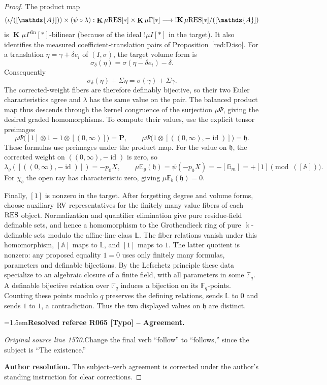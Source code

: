 \documentclass[12pt]{amsart}
\newcommand{\ResolvedRefereeRemark}[5]{%
  \par\medskip\begingroup\normalfont\small\color{gray}%
  \emergencystretch=1.5em\noindent\textbf{Resolved referee R#1 [#2] -- #3.}\par\nobreak\noindent #4\par
  \medskip\color{ResolutionGreen}\noindent\textbf{Author resolution.} #5\par
  \endgroup\medskip
}
\theoremstyle{plain}
\theoremstyle{definition}
\theoremstyle{remark}
\numberwithin{equation}{section}
\theoremstyle{plain}
\newcommand{\RV}{\textup{RV}}
\DeclareMathOperator{\id}{id}
\DeclareMathOperator{\K}{\mathds{k}}
\newcommand{\A}{\mathds{A}}
\newcommand{\G}{\mathds{G}}
\newcommand{\gh}{\mathfrak{h}}
\newcommand{\0}{\emptyset}
\newcommand{\bb}[1]{\mathbb{#1}}
\newcommand{\fun}{\longrightarrow}
\newcommand{\mG}{{\mu}{\Gamma}}
\newcommand{\RES}{\textup{RES}}
\newcommand{\mgRES}{{\mu}{\RES}}
\newcommand{\mgE}{{\mu}{\bb E}}
\DeclareMathOperator{\ggk}{\mathbf{K}}
\DeclareMathOperator{\sggk}{!\mathbf{K}}
\DeclareMathOperator{\fin}{fin}
\begin{document}
\begin{proof}
The product map
\[
(\iota /([\A])) \times (\psi \circ \lambda) : \ggk \mgRES[*] \times  \ggk \mG[*] \fun    \sggk \mgRES[*] /([\A])
\]
is $\ggk \mG^{\fin}[*]$-bilinear (because of the ideal $!\mu I[*]$ in the target).
It also identifies the measured coefficient-translation pairs of Proposition~\ref{red:D:iso}. For a translation $\eta=\gamma+\delta e_i$ of $(I,\sigma)$, the target volume form is
\[
\sigma_\delta(\eta)=\sigma(\eta-\delta e_i)-\delta.
\]
Consequently
\[
\sigma_\delta(\eta)+\Sigma\eta=\sigma(\gamma)+\Sigma\gamma.
\]
The corrected-weight fibers are therefore definably bijective, so their two Euler characteristics agree and $\lambda$ has the same value on the pair. The balanced product map thus descends through the kernel congruence of the surjection ${\mu}\Psi$, giving the desired graded homomorphisms. To compute their values, use the explicit tensor preimages
\[
{\mu}\Psi\bigl([1]\otimes1-1\otimes[(0,\infty)]\bigr)=\bm P,
\qquad
{\mu}\Psi\bigl(1\otimes[((0,\infty),-\id)]\bigr)=\gh.
\]
These formulas use preimages under the product map.
For the value on $\gh$, the corrected weight on $((0,\infty),-\id)$ is zero, so
\[
\lambda_g([((0,\infty),-\id)])=-p_0X,
\qquad \mgE_g(\gh)=\psi(-p_0X)=-[\G_m]=+[1]\pmod{([\A])}.
\]
For $\chi_b$ the open ray has characteristic zero, giving $\mgE_b(\gh)=0$.

Finally, $[1]$ is nonzero in the target. After forgetting degree and volume forms, choose auxiliary $\RV$ representatives for the finitely many value fibers of each $\RES$ object. Normalization and quantifier elimination give pure residue-field definable sets, and hence a homomorphism to the Grothendieck ring of pure $\K$-definable sets modulo the affine-line class $\mathbb L$. The fiber relations vanish under this homomorphism, $[\A]$ maps to $\mathbb L$, and $[1]$ maps to $1$. The latter quotient is nonzero: any proposed equality $1=0$ uses only finitely many formulas, parameters and definable bijections. By the Lefschetz principle these data specialize to an algebraic closure of a finite field, with all parameters in some $\mathbb F_q$. A definable bijective relation over $\mathbb F_q$ induces a bijection on its $\mathbb F_q$-points. Counting these points modulo $q$ preserves the defining relations, sends $\mathbb L$ to $0$ and sends $1$ to $1$, a contradiction. Thus the two displayed values on $\gh$ are distinct.


\ResolvedRefereeRemark{065}{Typo}{Agreement}{%
\textit{Original source line 1570.}\quad Change the final verb ``follow'' to ``follows,'' since the subject is ``The existence.''
}{The subject--verb agreement is corrected under the author's standing instruction for clear corrections.}
\end{proof}
\end{document}
